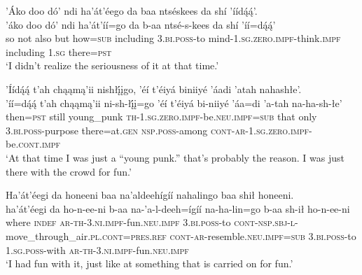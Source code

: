 \ea\label{ex:text1-72-1}
’Áko doo dó’ ndi ha’át’éego da baa ntséskees da shí ’íídą́ą́’.\\
\gll ’áko	doo	dó’	ndi	ha’át’íí=go	da	b-aa	ntsé-s-kees	da	shí	’íí=dą́ą́’\\
     so	not	also	but	how=\textsc{sub}	including	3.\textsc{bi}.\textsc{poss}-to	mind-1.\textsc{sg}.\textsc{zero}.\textsc{impf}-think.\textsc{impf}	including	1.\textsc{sg}	there=\textsc{pst}\\
\glt `I didn't realize the seriousness of it at that time.'
\z

\ea\label{ex:text1-72-2}
’Íídą́ą́ t’ah chąąmą’ii nishłį́įgo, ’éí t’éiyá biniiyé ’áadi ’atah nahashłe’.\\
\gll ’íí=dą́ą́	t’ah	chąąmą’ii	ni-sh-łį́į=go	’éí	t’éiyá	bi-niiyé	’áa=di	’a-tah	na-ha-sh-łe’\\
     then=\textsc{pst}	still	young\_punk	\textsc{th}-1.\textsc{sg}.\textsc{zero}.\textsc{impf}-be.\textsc{neu}.\textsc{impf}=\textsc{sub}	that	only	3.\textsc{bi}.\textsc{poss}-purpose	there=at.\textsc{gen}	\textsc{nsp}.\textsc{poss}-among	\textsc{cont}-\textsc{ar}-1.\textsc{sg}.\textsc{zero}.\textsc{impf}-be.\textsc{cont}.\textsc{impf}\\
\glt `At that time I was just a ``young punk.'' that's probably the reason. I was just there with the crowd for fun.'
\z

\ea\label{ex:text1-72-3}
Ha’át’éegi da honeeni baa na’aldeehígíí nahalingo baa shił honeeni.\\
\gll ha’át’éegi	da	ho-n-ee-ni	b-aa	na-’a-l-deeh=ígíí	na-ha-lin=go	b-aa	sh-ił	ho-n-ee-ni\\
     where		\textsc{indef}	\textsc{ar}-\textsc{th}-3.\textsc{ni}.\textsc{impf}-fun.\textsc{neu}.\textsc{impf}	3.\textsc{bi}.\textsc{poss}-to	\textsc{cont}-\textsc{nsp}.\textsc{sbj}-\textsc{l}-move\_through\_air.\textsc{pl}.\textsc{cont}=\textsc{pres}.\textsc{ref}	\textsc{cont}-\textsc{ar}-resemble.\textsc{neu}.\textsc{impf}=\textsc{sub}	3.\textsc{bi}.\textsc{poss}-to	1.\textsc{sg}.\textsc{poss}-with	\textsc{ar}-\textsc{th}-3.\textsc{ni}.\textsc{impf}-fun.\textsc{neu}.\textsc{impf}\\
\glt `I had fun with it, just like at something that is carried on for fun.'
\z
